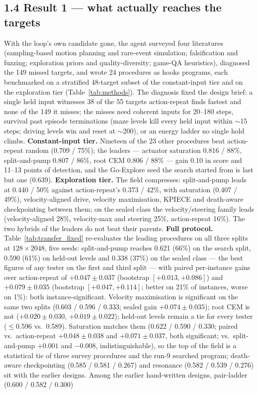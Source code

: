 \subsection*{1.4 Result 1 --- what actually reaches the targets}


With the loop's own candidate gone, the agent surveyed four literatures (sampling-based motion planning and rare-event simulation;
falsification and fuzzing; exploration priors and quality-diversity; game-QA heuristics), diagnosed the 149 missed targets, and wrote 24
procedures as hooks programs, each benchmarked on a stratified 48-target subset of the constant-input tier and on the exploration tier
(Table~\ref{tab:methods}). The diagnosis fixed the design brief: a single held input witnesses 38 of the 55 targets action-repeat finds
fastest and none of the 149 it misses; the misses need coherent inputs for 20--180 steps, survival past episode terminations (maze levels
kill every held input within $\sim$15 steps; driving levels win and reset at $\sim$200), or an energy ladder no single hold climbs.
\textbf{Constant-input tier.} Nineteen of the 23 other procedures beat action-repeat random (0.709 / 75\%); the leaders --- actuator saturation 0.816 / 88\%,
split-and-pump 0.807 / 86\%, root CEM 0.806 / 88\% --- gain 0.10 in score and 11--13 points of detection, and the Go-Explore seed the
search started from is last but one (0.639). \textbf{Exploration tier.} The field compresses: split-and-pump leads at 0.440 / 50\% against
action-repeat's 0.373 / 42\%, with saturation (0.407 / 49\%), velocity-aligned drive, velocity maximisation, KPIECE and death-aware
checkpointing between them; on the sealed class the velocity/steering family leads (velocity-aligned 28\%, velocity-max and steering
25\%, action-repeat 16\%). The two hybrids of the leaders do not beat their parents. \textbf{Full protocol.} Table~\ref{tab:transfer_fixed} re-evaluates the leading procedures on all three splits at $128\times2048$, five seeds: split-and-pump reaches 0.621 (66\%) on the search split, 0.590 (61\%) on held-out levels and 0.338 (37\%) on the sealed class --- the best figures of any tester on the first and third split --- with paired per-instance gains over action-repeat of $+0.047\pm0.037$ (bootstrap $[+0.013,+0.086]$) and $+0.079\pm0.035$ (bootstrap $[+0.047,+0.114]$; better on 21\% of instances, worse on 1\%): both instance-significant. Velocity maximisation is significant on the same two splits (0.603 / 0.596 / 0.333; sealed gain $+0.074\pm0.035$); root CEM is not ($+0.020\pm0.030$, $+0.019\pm0.022$); held-out levels remain a tie for every tester ($\le$0.596 vs.\ 0.589). Saturation matches them (0.622 / 0.590 / 0.330; paired vs.\ action-repeat $+0.048\pm0.038$ and $+0.071\pm0.037$, both significant; vs.\ split-and-pump $+0.001$ and $-0.008$, indistinguishable), so the top of the field is a statistical tie of three survey procedures and the run-9 searched program; death-aware checkpointing (0.585 / 0.581 / 0.267) and resonance (0.582 / 0.539 / 0.276) sit with the earlier designs. Among the earlier hand-written designs, pair-ladder (0.600 / 0.582 / 0.300)
